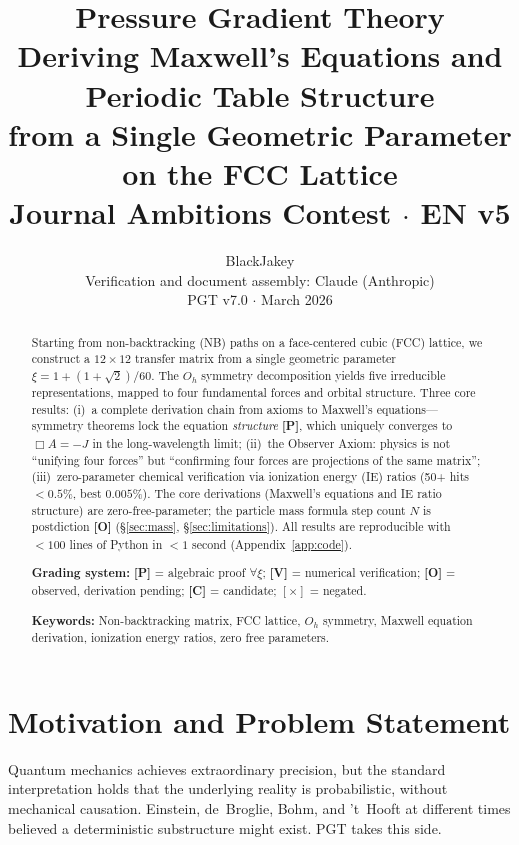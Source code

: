 \documentclass[11pt,a4paper]{article}
\title{\textbf{Pressure Gradient Theory}\\[6pt]
\large Deriving Maxwell's Equations and Periodic Table Structure\\
from a Single Geometric Parameter on the FCC Lattice\\[8pt]
\normalsize Journal Ambitions Contest $\cdot$ EN v5}
\author{BlackJakey\\[2pt]
{\small Verification and document assembly: Claude (Anthropic)}\\[2pt]
{\small PGT v7.0 $\cdot$ March 2026}}
\date{}
\newcommand{\gradeP}{\textbf{[P]}}
\newcommand{\gradeV}{\textbf{[V]}}
\newcommand{\gradeO}{\textbf{[O]}}
\newcommand{\gradeC}{\textbf{[C]}}
\begin{document}
\maketitle
\thispagestyle{fancy}

\begin{abstract}
\noindent
Starting from non-backtracking (NB) paths on a face-centered cubic (FCC) lattice, we construct a $12\times 12$ transfer matrix from a single geometric parameter $\xi = 1 + (1+\sqrt{2})/60$. The $O_h$ symmetry decomposition yields five irreducible representations, mapped to four fundamental forces and orbital structure. Three core results: (i)~a complete derivation chain from axioms to Maxwell's equations---symmetry theorems lock the equation \emph{structure} \gradeP, which uniquely converges to $\Box A = -J$ in the long-wavelength limit; (ii)~the Observer Axiom: physics is not ``unifying four forces'' but ``confirming four forces are projections of the same matrix''; (iii)~zero-parameter chemical verification via ionization energy (IE) ratios (50+ hits ${<}0.5\%$, best $0.005\%$). The core derivations (Maxwell's equations and IE ratio structure) are zero-free-parameter; the particle mass formula step count $N$ is postdiction \gradeO{} (\S\ref{sec:mass}, \S\ref{sec:limitations}). All results are reproducible with ${<}100$ lines of Python in ${<}1$ second (Appendix~\ref{app:code}).

\medskip\noindent
\textbf{Grading system:} \gradeP{} = algebraic proof $\forall\xi$; \gradeV{} = numerical verification; \gradeO{} = observed, derivation pending; \gradeC{} = candidate; $[\times]$ = negated.

\medskip\noindent
\textbf{Keywords:} Non-backtracking matrix, FCC lattice, $O_h$ symmetry, Maxwell equation derivation, ionization energy ratios, zero free parameters.
\end{abstract}

\tableofcontents
\newpage

\section{Motivation and Problem Statement}\label{sec:motivation}

Quantum mechanics achieves extraordinary precision, but the standard interpretation holds that the underlying reality is probabilistic, without mechanical causation. Einstein, de~Broglie, Bohm, and 't~Hooft at different times believed a deterministic substructure might exist. PGT takes this side.
\end{document}
